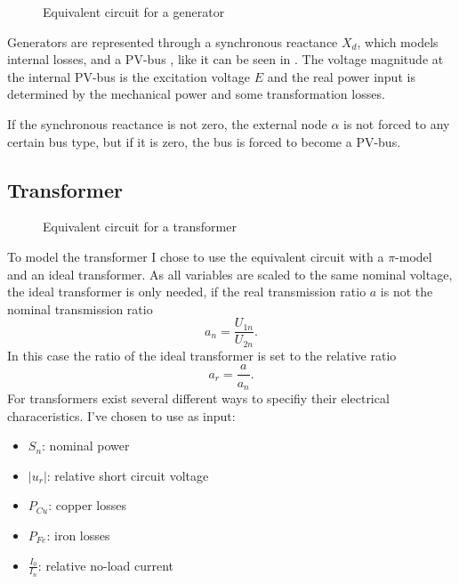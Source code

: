 \begin{figure}
	\centering
	
	\caption{Equivalent circuit for a generator}
	\label{fig:generator}
\end{figure}

Generators are represented through a synchronous reactance $X_d$, which models internal losses, and a PV-bus \citep[p. 55]{powerSystemAnalysis}, like it can be seen in . The voltage magnitude at the internal PV-bus is the excitation voltage $E$ and the real power input is determined by the mechanical power and some transformation losses. 

If the synchronous reactance is not zero, the external node $\alpha$ is not forced to any certain bus type, but if it is zero, the bus is forced to become a PV-bus.

\subsection{Transformer}

\begin{figure}
	\centering
	
	\caption{Equivalent circuit for a transformer}
	\label{fig:transformer}
\end{figure}

To model the transformer I chose to use the equivalent circuit  with a $\pi$-model and an ideal transformer. As all variables are scaled to the same nominal voltage, the ideal transformer is only needed, if the real transmission ratio $a$ is not the nominal transmission ratio
\begin{equation}
	a_n = \frac{U_{1n}}{U_{2n}}.
\end{equation}
In this case the ratio of the ideal transformer is set to the relative ratio
\begin{equation}
	a_r = \frac{a}{a_n}.
\end{equation}
For transformers exist several different ways to specifiy their electrical characeristics. I've chosen to use as input:
\begin{itemize}
	\item $S_n$: nominal power
	\item $|u_r|$: relative short circuit voltage
	\item $P_{Cu}$: copper losses
	\item $P_{Fe}$: iron losses
	\item $\frac{I_0}{I_n}$: relative no-load current
\end{itemize}

